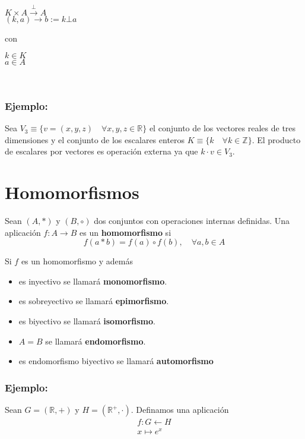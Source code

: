 \begin{minipage}{0.5\textwidth}
\begin{center}
$K\times A \overset{\bot}{\rightarrow} A$\\
$(k,a) \rightarrow b:=k\bot a$
\end{center}
\end{minipage} con
\quad
\begin{minipage}{0.4\textwidth}
$k\in K$\\
$a\in A$
\end{minipage}\\

\subsubsection*{Ejemplo:}

Sea $V_3 \equiv \lbrace v=(x,y,z)\quad \forall x,y,z \in \mathbb{R}\rbrace$ el conjunto de los vectores reales de tres dimensiones y el conjunto de los escalares enteros  $K\equiv \lbrace k\quad \forall k \in \mathbb{Z}\rbrace$. El producto de escalares por vectores es operación externa ya que $k\cdot v \in V_3$.

\section{Homomorfismos}
Sean $(A,*)$ y $(B,\circ)$ dos conjuntos con operaciones internas definidas. Una aplicación $f: A \rightarrow B$ es un \textbf{homomorfismo} si
$$
f(a*b)=f(a)\circ f(b), \quad \forall a,b \in A
$$

Si $f$ es un homomorfismo y además
\begin{itemize}
\item es inyectivo se llamará \textbf{monomorfismo}.
\item es sobreyectivo se llamará \textbf{epimorfismo}.
\item es biyectivo se llamará \textbf{isomorfismo}.
\item $A=B$ se llamará \textbf{endomorfismo}.
\item es endomorfismo biyectivo se llamará \textbf{automorfismo}
\end{itemize}



\subsubsection*{Ejemplo:}
Sean $G=(\mathbb{R},+)$ y $H=(\mathbb{R}^+,\cdot)$. Definamos una aplicación
$$
\begin{matrix}
f:G\leftarrow H\\
x \mapsto e^x
\end{matrix}
$$

